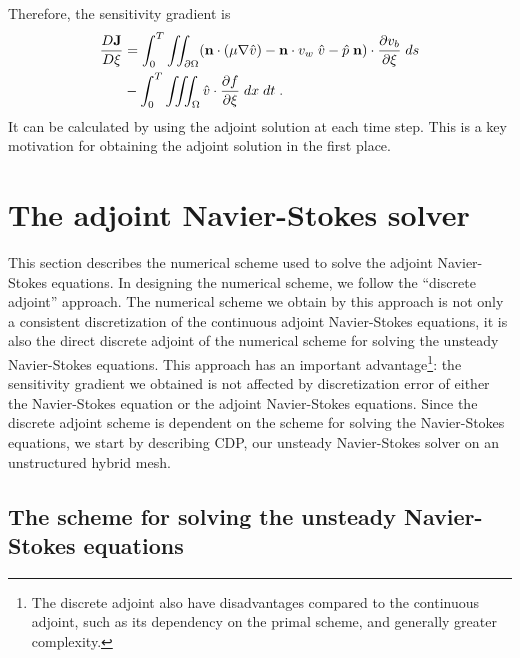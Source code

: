Therefore, the sensitivity gradient is
\begin{equation} \begin{split}
  \frac{D {\bf J}}{D \xi} &= 
   \int_0^T \iint_{\partial\Omega} ( {\bf n} \cdot (\mu \nabla {\hat v}) -
   {\bf n} \cdot v_w\; {\hat v} - {\hat p}\; {\bf n} )\cdot
   \frac{\partial v_b}{\partial \xi} \; ds  \\
   &- \int_0^T \iiint_\Omega {\hat v} \cdot \frac{\partial f}{\partial\xi}
     \; dx\;dt \;.
\end{split} \end{equation}
It can be calculated by using the adjoint solution at each time step.
This is a key motivation for obtaining the adjoint solution in the first place.



%

\section{The adjoint Navier-Stokes solver}

This section describes the numerical scheme used to solve the adjoint
Navier-Stokes equations.  In designing the numerical scheme, we follow the
``discrete adjoint'' approach.  The numerical scheme we obtain by this
approach is not only a consistent discretization of the continuous
adjoint Navier-Stokes equations, it is also the direct discrete adjoint
of the numerical scheme for solving the unsteady Navier-Stokes equations.
This approach has an important advantage\footnote{
The discrete adjoint also have disadvantages compared to the
continuous adjoint, such as its dependency on the primal scheme, and generally
greater complexity.}:
the sensitivity gradient we obtained
is not affected by discretization error of either the Navier-Stokes equation
or the adjoint Navier-Stokes equations.  Since the discrete adjoint scheme is
dependent on the scheme for solving the Navier-Stokes equations, we start by
describing CDP, our unsteady Navier-Stokes solver on an unstructured hybrid
mesh.

\subsection{The scheme for solving the unsteady Navier-Stokes equations}

